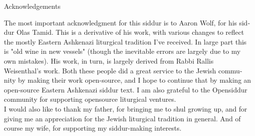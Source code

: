 \documentclass[twoside, openany, parskip=half, 11pt]{book}
\begin{document}
\begin{minipage}{\textwidth}

\begin{center} %
\begin{LARGE}
Acknowledgements
\end{LARGE}
\end{center}

\begin{english}
The most important acknowledgment for this siddur is to Aaron Wolf, for his siddur Olas Tamid. This is a derivative of his work, with various changes to reflect the mostly Eastern Ashkenazi liturgical tradition I've received. In large part this is "old wine in new vessels" (though the inevitable errors are largely due to my own mistakes). His work, in turn, is largely derived from Rabbi Rallis Weisenthal's work. Both these people did a great service to the Jewish community by making their work open-source, and I hope to continue that by making an open-source Eastern Ashkenazi siddur text. I am also grateful to the Opensiddur community for supporting opensource liturgical ventures.\\

I would also like to thank my father, for bringing me to shul growing up, and for giving me an appreciation for the Jewish liturgical tradition in general. And of course my wife, for supporting my siddur-making interests.


\end{english}

\end{minipage}





\renewcommand{\contentsname}{}
\tableofcontents

\clearpage



\setcounter{page}{1}

\vspace*{\fill}

\thispagestyle{empty}
\begin{Large}
\begin{center}
\end{center}
\end{Large}
\end{document}
